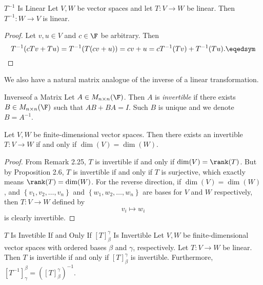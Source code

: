 \documentclass[linearalgebraI]{subfiles}
\begin{document}
    \begin{prop}{$T^{-1}$ Is Linear}
        Let $V, W$ be vector spaces and let $T:V\to W$ be linear. Then $T^{-1} : W\to V$ is linear.
    \end{prop}

    \begin{proof}
        Let $v, u\in V$ and $c\in \F$ be arbitrary. Then
        \begin{equation*}
            T^{-1}(cTv + Tu) = T^{-1}(T(cv+u)) = cv+u = cT^{-1}(Tv)+T^{-1}(Tu). \eqedsym
        \end{equation*}
    \end{proof}

    \begin{remark}
        We also have a natural matrix analogue of the inverse of a linear transformation.
    \end{remark}

    \begin{definition}{Inverse}{of a Matrix}
        Let $A\in M_{n\times n}(\F)$. Then $A$ is \emph{invertible} if there exists $B\in M_{n\times n}(\F)$ such that $AB+BA=I$. Such $B$ is unique and we denote $B=A^{-1}$.  
    \end{definition}

    \begin{prop}{}
        Let $V, W$ be finite-dimensional vector spaces. Then there exists an invertible $T:V\to W$ if and only if $\dim(V)=\dim(W)$.
    \end{prop}

    \begin{proof}
        From Remark 2.25, $T$ is invertible if and only if $\dim(V)=\rank(T)$. But by Proposition 2.6, $T$ is invertible if and only if $T$ is surjective, which exactly means $\rank(T)=\dim(W)$. For the reverse direction, if $\dim(V)=\dim(W)$, and $\left\lbrace v_1,v_2,\ldots,v_n \right\rbrace$ and $\left\lbrace w_1,w_2,\ldots,w_n \right\rbrace$ are bases for $V$ and $W$ respectively, then $T:V\to W$ defined by
        \begin{equation*}
            v_i\mapsto w_i
        \end{equation*}
        is clearly invertible.
    \end{proof}

    \begin{prop}{$T$ Is Invetible If and Only If $\left[ T \right] ^\gamma_\beta$ Is Invertible}
        Let $V, W$ be finite-dimensional vector spaces with ordered bases $\beta$ and $\gamma$, respectively. Let $T: V\to W$ be linear. Then $T$ is invertible if and only if $[T]^\gamma_\beta$ is invertible. Furthermore, $[T^{-1}]^\beta_\gamma = \left( [T]^\gamma_\beta \right)^{-1}$.
    \end{prop}
\end{document}
